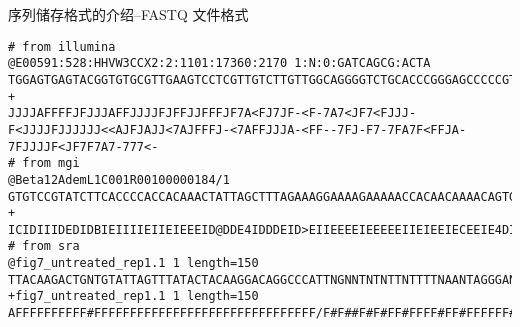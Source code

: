\begin{frame}[fragile]{序列储存格式的介绍--FASTQ 文件格式}
    \begin{lstlisting}
# from illumina
@E00591:528:HHVW3CCX2:2:1101:17360:2170 1:N:0:GATCAGCG:ACTA
TGGAGTGAGTACGGTGTGCGTTGAAGTCCTCGTTGTCTTGTTGGCAGGGGTCTGCACCCGGGAGCCCCCGTTCTATATCATCACTGAGATCATGACCTACGGGAACCTCCTCGACTACCTCAGGGAGTGCAACTGCAACGAG
+
JJJJAFFFFJFJJJAFFJJJJFJFFJJFFFJF7A<FJ7JF-<F-7A7<JF7<FJJJ-F<JJJJFJJJJJJ<<AJFJAJJ<7AJFFFJ-<7AFFJJJA-<FF--7FJ-F7-7FA7F<FFJA-7FJJJJF<JF7F7A7-777<-
# from mgi
@Beta12AdemL1C001R00100000184/1
GTGTCCGTATCTTCACCCCACCACAAACTATTAGCTTTAGAAAGGAAAAGAAAAACCACAACAAAACAGTGTGTGTGTACCAAAGACTTATATGTGCATAAGCAAAAGCAAACAATAGCATTAGCAGGAACTCGTGGACATTCCAGGGAA
+
ICIDIIIDEDIDBIEIIIIEIIEIEEEID@DDE4IDDDEID>EIIEEEEIEEEEEIIEIEEIECEEIE4DIDIDDC6DEIIE@E6EI5CBDEDICIIECEEIIAEEEIIDEEIE:CD:IECABIIEI>E8ICI,CI9DIEDCIIE@>HEC
# from sra
@fig7_untreated_rep1.1 1 length=150
TTACAAGACTGNTGTATTAGTTTATACTACAAGGACAGGCCCATTNGNNTNTNTTNTTTTNAANTAGGGANATAGTTGGTATTAGGATTAGNATTGTTGTGAAGTATAGTANGGATGCTACTTGNCCAATGATGGTAAAAGGGTAGCTTA
+fig7_untreated_rep1.1 1 length=150
AFFFFFFFFFF#FFFFFFFFFFFFFFFFFFFFFFFFFFFFFFF/F#F##F#F#FF#FFFF#FF#FFFFFF#FFFFFFFFFFFFFFFFFFFA#FFFFFFFFFFFFFFFFFFF#FFFFFFFFFFFF#A/FFFF/FFFFFFF/FFFFFFFFFF
    \end{lstlisting}
\end{frame}